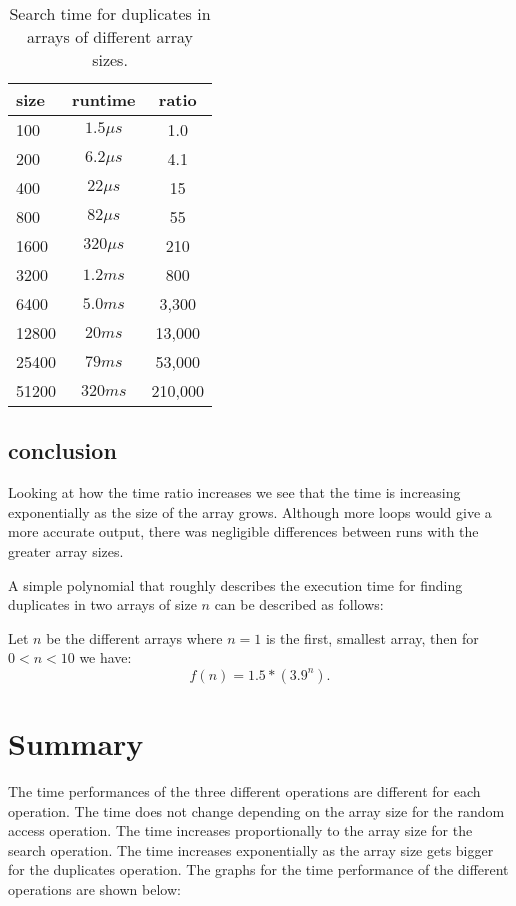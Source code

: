 \documentclass[a4paper,11pt]{article}
\begin{document}
\begin{table}[h]
  \begin{center}
  \begin{tabular}{l|c|c}
  \textbf{size} & \textbf{runtime} & \textbf{ratio}\\
  \hline
    100      & $1.5 \mu s$  &     1.0\\
    200      & $6.2 \mu s$  &     4.1\\
    400      & $22 \mu s$   &     15\\
    800      & $82 \mu s$   &     55\\
    1600     & $320 \mu s$  &     210\\
    3200     & $1.2 ms$     &     800\\
    6400     & $5.0 ms$     &     3,300\\
    12800    & $20 ms$      &     13,000\\
    25400    & $79 ms$      &     53,000\\
    51200    & $320 ms$     &     210,000\\ 
  \end{tabular}
  \caption{Search time for duplicates in arrays of different array sizes.}
  \label{tab:table3}
  \end{center}
  \end{table}

\subsection*{conclusion}

Looking at how the time ratio increases we see that the time is
increasing exponentially as the size of the array grows. Although more
loops would give a more accurate output, there was negligible differences
between runs with the greater array sizes.

A simple polynomial that roughly describes the execution time for finding
duplicates in two arrays of size $n$ can be described as follows:

Let $n$ be the different arrays where $n=1$ is the first, smallest array, 
then for $0 < n < 10$ we have:
$$f(n) = 1.5*(3.9^n).$$

\section*{Summary}

The time performances of the three different operations are different for
each operation. The time does not change depending on the array size for
the random access operation. The time increases proportionally to the 
array size for the search operation. The time increases exponentially as
the array size gets bigger for the duplicates operation. The graphs for
the time performance of the different operations are shown below:
\end{document}

